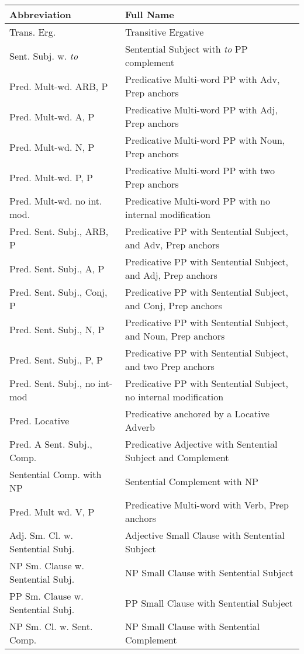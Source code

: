 \small 
\begin{tabular}{ll} 
Abbreviation&Full Name\\ 
\hline 
Trans. Erg. & Transitive Ergative \\ 
Sent. Subj. w. {\it to} & Sentential Subject with {\it to} PP complement \\ 
Pred. Mult-wd. ARB, P & Predicative Multi-word PP with Adv, Prep anchors\\ 
Pred. Mult-wd. A, P & Predicative Multi-word PP with Adj, Prep anchors\\ 
Pred. Mult-wd. N, P & Predicative Multi-word PP with Noun, Prep 
anchors\\ 
Pred. Mult-wd. P, P & Predicative Multi-word PP with two Prep 
anchors\\ 
Pred. Mult-wd. no int. mod. & Predicative Multi-word PP with no internal 
modification\\ 
Pred. Sent. Subj., ARB, P & Predicative PP with Sentential Subject, and 
Adv, Prep anchors\\ 
Pred. Sent. Subj., A, P & Predicative PP with Sentential Subject, and 
Adj, Prep anchors\\ 
Pred. Sent. Subj., Conj, P & Predicative PP with Sentential Subject, and 
Conj, Prep anchors\\ 
Pred. Sent. Subj., N, P & Predicative PP with Sentential Subject, and 
Noun, Prep anchors\\ 
Pred. Sent. Subj., P, P & Predicative PP with Sentential Subject, and two 
Prep anchors\\ 
Pred. Sent. Subj., no int-mod & Predicative PP with Sentential Subject, 
no internal modification\\ 
Pred. Locative & Predicative anchored by a Locative Adverb\\ 
Pred. A Sent. Subj., Comp. & Predicative Adjective with Sentential 
Subject and Complement\\ 
Sentential Comp. with NP&Sentential Complement with NP\\ 
Pred. Mult wd. V, P & Predicative Multi-word with Verb, Prep anchors \\ 
Adj. Sm. Cl. w. Sentential Subj.&Adjective Small Clause with Sentential Subject\\ 
NP Sm. Clause w. Sentential Subj.&NP Small Clause with Sentential Subject\\ 
PP Sm. Clause w. Sentential Subj.&PP Small Clause with Sentential Subject\\ 
NP Sm. Cl. w. Sent. Comp.&NP Small Clause with Sentential Complement\\ 

\end{tabular}

